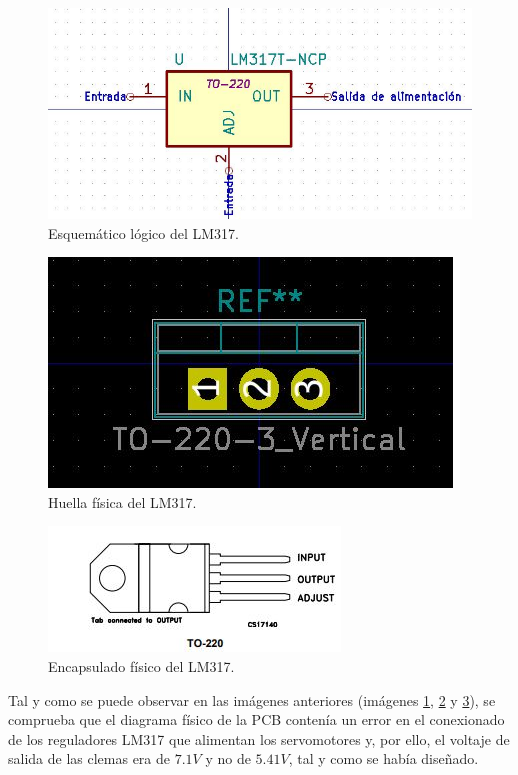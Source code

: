 \begin{itemize}
    \begin{figure}[H]
    \centering 
    \includegraphics[width=0.65\linewidth]{pictures/FailPinout2.JPG}
    \caption{Esquemático lógico del LM317.}
    \label{fig:Logico_LM317}
    \end{figure}
    
    \begin{figure}[H]
    \centering 
    \includegraphics[width=0.55\linewidth]{pictures/FailPinout3.JPG}
    \caption{Huella física del LM317.}
    \label{fig:Huella_LM317}
    \end{figure}
    
    \begin{figure}[H]
    \centering 
    \includegraphics[width=0.65\linewidth]{pictures/FailPinout.JPG}
    \caption{Encapsulado físico del LM317.}
    \label{fig:Encapsulado_LM317}
    \end{figure}
    
    Tal y como se puede observar en las imágenes anteriores (imágenes \ref{fig:Logico_LM317}, \ref{fig:Huella_LM317} y \ref{fig:Encapsulado_LM317}), se comprueba que el diagrama físico de la \ac{PCB} contenía un error en el conexionado de los reguladores LM317 que alimentan los servomotores y, por ello, el voltaje de salida de las clemas era de $7.1V$ y no de $5.41V$, tal y como se había diseñado.
    

\end{itemize}
